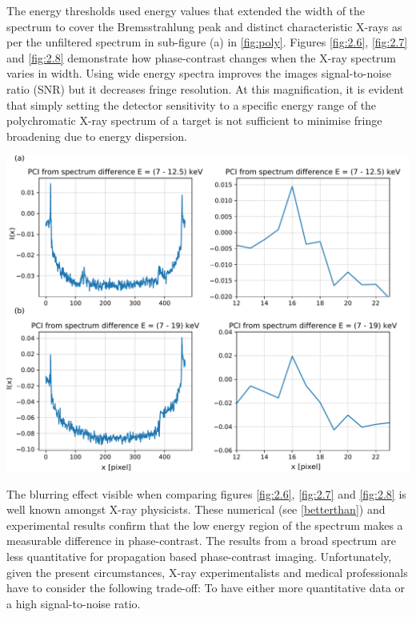 \documentclass[10pt, a4paper, singlespacing]{report}
\newenvironment{Figure}
    {\par\medskip\noindent\minipage{\linewidth}}
    {\endminipage\par\medskip}
\begin{document}
The energy thresholds used energy values that extended the width of the spectrum to cover the Bremsstrahlung peak and distinct characteristic X-rays as per the unfiltered spectrum in sub-figure (a) in \ref{fig:poly}. Figures \ref{fig:2.6}, \ref{fig:2.7} and \ref{fig:2.8} demonstrate how phase-contrast changes when the X-ray spectrum varies in width. Using wide energy spectra improves the images signal-to-noise ratio (SNR) but it decreases fringe resolution. At this magnification, it is evident that simply setting the detector sensitivity to a specific energy range of the polychromatic X-ray spectrum of a target is not sufficient to minimise fringe broadening due to energy dispersion. 
\begin{Figure}
 \centering
 \includegraphics[width=\linewidth]{diff.pdf}
\label{fig:2.9}  
\end{Figure}
The blurring effect visible when comparing figures \ref{fig:2.6}, \ref{fig:2.7} and \ref{fig:2.8} is well known amongst X-ray physicists. These numerical (see \ref{betterthan}) and experimental results confirm that the low energy region of the spectrum makes a measurable difference in phase-contrast. The results from a broad spectrum are less quantitative for propagation based phase-contrast imaging. Unfortunately, given the present circumstances, X-ray experimentalists and medical professionals have to consider the following trade-off: To have either more quantitative data or a high signal-to-noise ratio.
\end{document}
